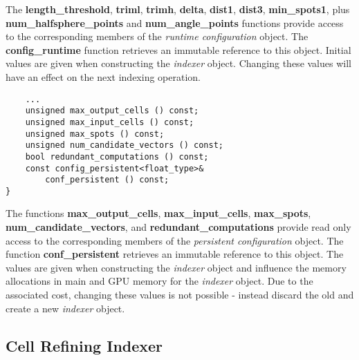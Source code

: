 \documentclass[a4paper,10pt]{article}
\begin{document}
%
The \textbf{length\_threshold}, \textbf{triml}, \textbf{trimh}, \textbf{delta}, \textbf{dist1}, \textbf{dist3}, \textbf{min\_spots1}, plus \textbf{num\_half\-sphe\-re\_points} and \textbf{num\_angle\_points} functions provide access to the corresponding members of the \emph{runtime configuration} object. The \textbf{config\_runtime} function retrieves an immutable reference to this object. Initial values are given when constructing the \emph{indexer} object. Changing these values will have an effect on the next indexing operation.
%
\begin{lstlisting}
    ...
    unsigned max_output_cells () const;
    unsigned max_input_cells () const;
    unsigned max_spots () const;
    unsigned num_candidate_vectors () const;
    bool redundant_computations () const;
    const config_persistent<float_type>&
        conf_persistent () const;
}
\end{lstlisting}
%
The functions \textbf{max\_output\_cells}, \textbf{max\_input\_cells}, \textbf{max\_spots}, \textbf{num\_can\-di\-da\-te\_vec\-tors}, and \textbf{redundant\_computations} provide read only access to the corresponding members of the \emph{persistent configuration} object. The function \textbf{conf\_persistent} retrieves an immutable reference to this object. The values are given when constructing the \emph{indexer} object and influence the memory allocations in main and GPU memory for the \emph{indexer} object. Due to the associated cost, changing these values is not possible - instead discard the old and create a new \emph{indexer} object.

\subsection{Cell Refining Indexer}
\end{document}
